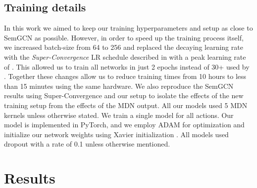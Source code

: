 \subsection{Training details}

In this work we aimed to keep our training hyperparameters and setup as close to SemGCN as possible. However, in order to speed up the training process itself, we increased batch-size from 64 to 256 and replaced the decaying learning rate with the \textit{Super-Convergence} LR schedule described in \cite{smith2017superconvergence} with a peak learning rate of . This allowed us to train all networks in just 2 epochs instead of 30+ used by \cite{Zhao_2019_CVPR}. Together these changes allow us to reduce training times from 10 hours to less than 15 minutes using the same hardware. We also reproduce the SemGCN results using Super-Convergence and our setup to isolate the effects of the new training setup from the effects of the MDN output. All our models used 5 MDN kernels unless otherwise stated. We train a single model for all actions. Our model is implemented in PyTorch, and we employ ADAM \cite{kingma2014adam} for optimization and initialize our network weights using Xavier initialization \cite{glorot2010understanding}. All models used dropout with a rate of 0.1 unless otherwise mentioned.

\section{Results}
\label{results}



